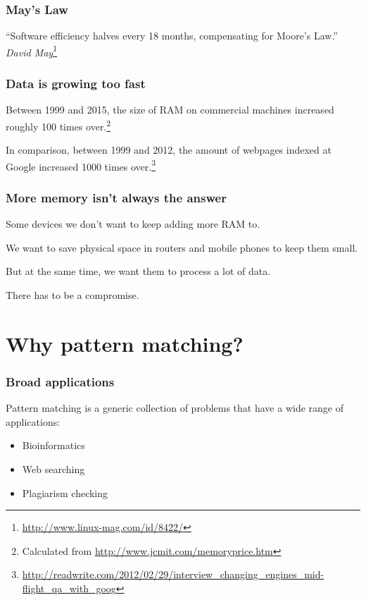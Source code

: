 \documentclass{beamer}
\begin{document}

\begin{frame}
\frametitle{May's Law}
``Software efficiency halves every 18 months, compensating for Moore's Law.''
\textit{David May}\footnote{\url{http://www.linux-mag.com/id/8422/}}
\end{frame}


\begin{frame}
\frametitle{Data is growing too fast}
Between 1999 and 2015, the size of RAM on commercial machines increased roughly 100 times over.\footnote{Calculated from \url{http://www.jcmit.com/memoryprice.htm}}

In comparison, between 1999 and 2012, the amount of webpages indexed at Google increased 1000 times over.\footnote{\url{http://readwrite.com/2012/02/29/interview_changing_engines_mid-flight_qa_with_goog}}
\end{frame}


\begin{frame}
\frametitle{More memory isn't always the answer}
Some devices we don't want to keep adding more RAM to.

We want to save physical space in routers and mobile phones to keep them small.

But at the same time, we want them to process a lot of data.

There has to be a compromise.
\end{frame}

\section{Why pattern matching?}

\begin{frame}
\frametitle{Broad applications}
Pattern matching is a generic collection of problems that have a wide range of applications:

\begin{itemize}
    \item Bioinformatics
    \item Web searching
    \item Plagiarism checking
\end{itemize}
\end{frame}
\end{document}
